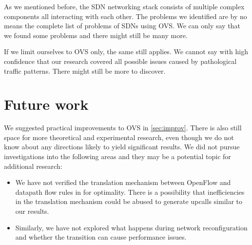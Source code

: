 As we mentioned before, the SDN networking stack consists of multiple complex components all interacting with each other. The problems we identified are by no means the complete list of problems of SDNs using OVS. We can only say that we found some problems and there might still be many more.

If we limit ourselves to OVS only, the same still applies. We cannot say with high confidence that our research covered all possible issues caused by pathological traffic patterns. There might still be more to discover.

\section{Future work}

We suggested practical improvements to OVS in \cref{sec:improv}. There is also still space for more theoretical and experimental research, even though we do not know about any directions likely to yield significant results. We did not pursue investigations into the following areas and they may be a potential topic for additional research:

\begin{itemize}
    \item We have not verified the translation mechanism between OpenFlow and datapath flow rules in  for optimality. There is a possibility that inefficiencies in the translation mechanism could be abused to generate upcalls similar to our results.

    \item Similarly, we have not explored what happens during network reconfiguration and whether the transition can cause performance issues.
\end{itemize}


